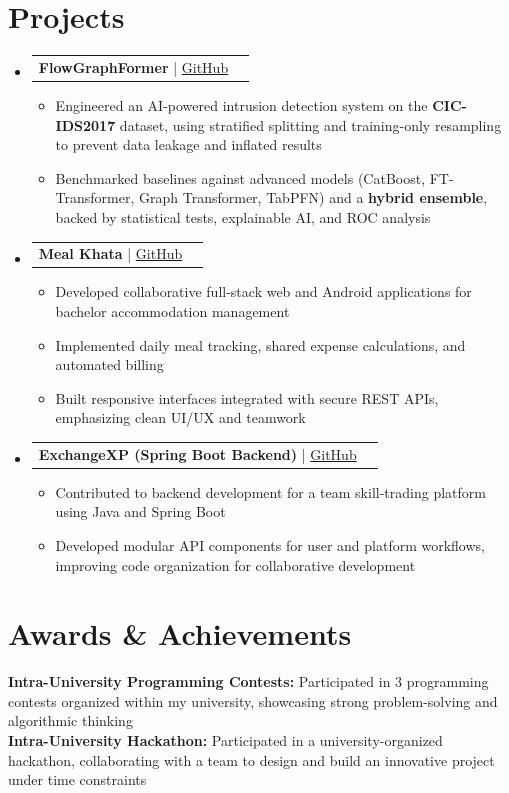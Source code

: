 \documentclass[letterpaper,11pt]{article}
\makeatletter
\newcommand{\resumeItem}[1]{\item\small{{#1 \vspace{-3pt}}}}
\newcommand{\resumeProjectHeading}[2]{
  \vspace{-2pt}\item
  \begin{tabular*}{0.97\textwidth}{l@{\extracolsep{\fill}}r}
      \small#1 & #2 \\
  \end{tabular*}\vspace{-8pt}
}
\newcommand{\resumeSubHeadingListStart}{\begin{itemize}[leftmargin=0.15in, label={}]}
\newcommand{\resumeSubHeadingListEnd}{\end{itemize}}
\newcommand{\resumeItemListStart}{\begin{itemize}[label={}]}
\newcommand{\resumeItemListEnd}{\end{itemize}\vspace{-5pt}}
\makeatother
\begin{document}
\section{Projects}
\resumeSubHeadingListStart
\resumeProjectHeading
{\textbf{FlowGraphFormer} | \href{https://github.com/alifjobaer12/FlowGraphFormer-A_Graph-Transformer_Hybrid_Models_for_Network_Intrusion_Detection}{GitHub}}{}
\resumeItemListStart
    \resumeItem{Engineered an AI-powered intrusion detection system on the \textbf{CIC-IDS2017} dataset, using stratified splitting and training-only resampling to prevent data leakage and inflated results}
    \resumeItem{Benchmarked baselines against advanced models (CatBoost, FT-Transformer, Graph Transformer, TabPFN) and a \textbf{hybrid ensemble}, backed by statistical tests, explainable AI, and ROC analysis}
\resumeItemListEnd

\resumeProjectHeading
{\textbf{Meal Khata} | \href{https://github.com/Rakibislam22/Smart-Bachelor-Life}{GitHub}}{}
\resumeItemListStart
    \resumeItem{Developed collaborative full-stack web and Android applications for bachelor accommodation management}
    \resumeItem{Implemented daily meal tracking, shared expense calculations, and automated billing}
    \resumeItem{Built responsive interfaces integrated with secure REST APIs, emphasizing clean UI/UX and teamwork}
\resumeItemListEnd

\resumeProjectHeading
{\textbf{ExchangeXP (Spring Boot Backend)} | \href{https://github.com/alifjobaer12/ExchangeXP}{GitHub}}{}
\resumeItemListStart
    \resumeItem{Contributed to backend development for a team skill-trading platform using Java and Spring Boot}
    \resumeItem{Developed modular API components for user and platform workflows, improving code organization for collaborative development}
\resumeItemListEnd


\resumeSubHeadingListEnd

\section{Awards \& Achievements}

\hspace{12pt}\textbf{Intra-University Programming Contests:} Participated in 3 programming contests organized within my university, showcasing strong problem-solving and algorithmic thinking \\[4pt]
\hspace{12pt}\textbf{Intra-University Hackathon:} Participated in a university-organized hackathon, collaborating with a team to design and build an innovative project under time constraints
\end{document}
